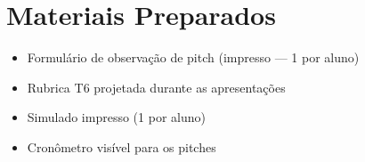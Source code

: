 \section{Materiais Preparados}
\begin{itemize}
  \item Formulário de observação de pitch (impresso — 1 por aluno)
  \item Rubrica T6 projetada durante as apresentações
  \item Simulado impresso (1 por aluno)
  \item Cronômetro visível para os pitches
\end{itemize}
